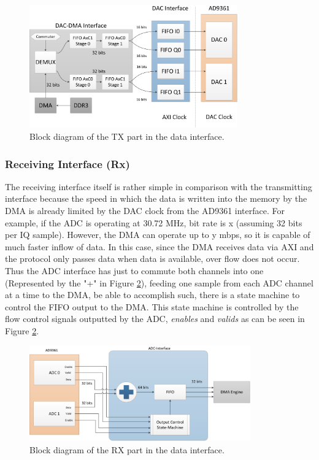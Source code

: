\begin{figure}[htbp]
    \centering
    \includegraphics[width=0.80\textwidth]{./figures/txdata_if}
    \caption{ Block diagram of the TX part in the data interface.
    \label{fig:dataiftx}}
\end{figure}

\subsubsection{Receiving Interface (Rx)}

The receiving interface itself is rather simple in comparison with the
transmitting interface because the speed in which the data is written into the
memory by the DMA is already limited by the DAC clock from the AD9361 interface.
For example, if the ADC is operating at 30.72 MHz, bit rate is x (assuming 32
bits per IQ sample). However, the DMA can operate up to y mbps, so it is capable
of much faster inflow of data. In this case, since the DMA receives data via AXI
and the protocol only passes data when data is available, over flow does not
occur. Thus the ADC interface has just to commute both channels into one
(Represented by the "+" in Figure \ref{fig:dataifrx}), feeding one sample from
each ADC channel at a time to the DMA, be able to accomplish such, there is a
state machine to control the FIFO output to the DMA. This state machine is
controlled by the flow control signals outputted by the ADC, \emph{enables} and
\emph{valids} as can be seen in Figure \ref{fig:dataifrx}.

\begin{figure}[htbp]
    \centering
    \includegraphics[width=0.85\textwidth]{./figures/rxdata_if}
    \caption{ Block diagram of the RX part in the data interface.
    \label{fig:dataifrx}}
\end{figure}

